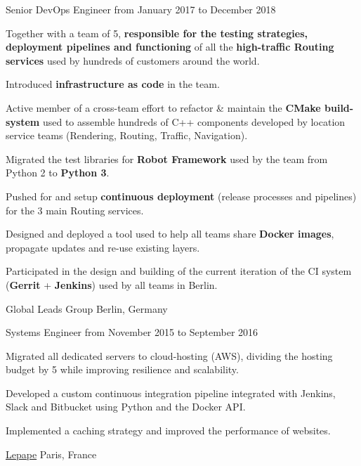 \documentclass[10pt, a4paper]{awesome-cv}
\begin{document}
\begin{cventries}
	\cventry
	{Senior DevOps Engineer}
	{from January 2017 to December 2018}
	{
		\begin{cvitems}
			\item {Together with a team of 5, \textbf{responsible for the testing strategies, deployment pipelines and functioning} of all the \textbf{high-traffic Routing services} used by hundreds of customers around the world.}
			\item {Introduced \textbf{infrastructure as code} in the team.}
			\item {Active member of a cross-team effort to refactor \& maintain the \textbf{CMake build-system} used to assemble hundreds of C++ components developed by location service teams (Rendering, Routing, Traffic, Navigation).}
			\item {Migrated the test libraries for \textbf{Robot Framework} used by the team from Python 2 to \textbf{Python 3}.}
			\item {Pushed for and setup \textbf{continuous deployment} (release processes and pipelines) for the 3 main Routing services.}
			\item {Designed and deployed a tool used to help all teams share \textbf{Docker images}, propagate updates and re-use existing layers.}
			\item {Participated in the design and building of the current iteration of the CI system (\textbf{Gerrit} + \textbf{Jenkins}) used by all teams in Berlin.}
		\end{cvitems}
	}

	\cventrytitle
	{Global Leads Group}
	{Berlin, Germany}

	\cventry
	{Systems Engineer}
	{from November 2015 to September 2016}
	{
		\begin{cvitems}
			\item {Migrated all dedicated servers to cloud-hosting (AWS), dividing the hosting budget by 5 while improving resilience and scalability.}
			\item {Developed a custom continuous integration pipeline integrated with Jenkins, Slack and Bitbucket using Python and the Docker API.}
			\item {Implemented a caching strategy and improved the performance of websites.}
		\end{cvitems}
	}

	\cventrytitle
	{\href{https://www.lepape.com}{Lepape}}
	{Paris, France}


\end{cventries}
\end{document}
